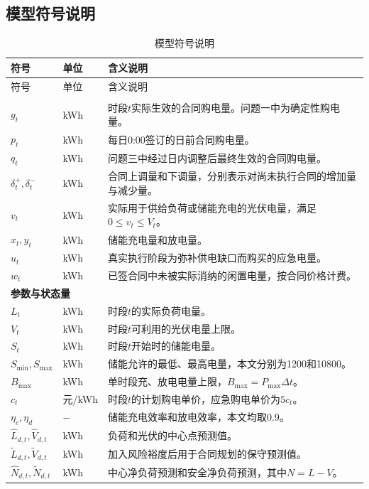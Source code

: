 \subsection{模型符号说明}
{\scriptsize
\begin{longtable}{p{}p{}p{}}
\caption{模型符号说明}\label{tab:symbol}\\
\toprule
符号 & 单位 & 含义说明 \\
\midrule
\endfirsthead
\toprule
符号 & 单位 & 含义说明 \\
\midrule
\endhead
\bottomrule
\endfoot
\multicolumn{3}{l}{\textbf{决策变量}}\\
$g_t$ & kWh & 时段$t$实际生效的合同购电量。问题一中为确定性购电量。 \\
$p_t$ & kWh & 每日0:00签订的日前合同购电量。 \\
$q_t$ & kWh & 问题三中经过日内调整后最终生效的合同购电量。 \\
$\delta_t^+,\delta_t^-$ & kWh & 合同上调量和下调量，分别表示对尚未执行合同的增加量与减少量。 \\
$v_t$ & kWh & 实际用于供给负荷或储能充电的光伏电量，满足$0\le v_t\le V_t$。 \\
$x_t,y_t$ & kWh & 储能充电量和放电量。 \\
$u_t$ & kWh & 真实执行阶段为弥补供电缺口而购买的应急电量。 \\
$w_t$ & kWh & 已签合同中未被实际消纳的闲置电量，按合同价格计费。 \\
\midrule
\multicolumn{3}{l}{\textbf{参数与状态量}}\\
$L_t$ & kWh & 时段$t$的实际负荷电量。 \\
$V_t$ & kWh & 时段$t$可利用的光伏电量上限。 \\
$S_t$ & kWh & 时段$t$开始时的储能电量。 \\
$S_{\min},S_{\max}$ & kWh & 储能允许的最低、最高电量，本文分别为1200和10800。 \\
$B_{\max}$ & kWh & 单时段充、放电电量上限，$B_{\max}=P_{\max}\Delta t$。 \\
$c_t$ & 元/kWh & 时段$t$的计划购电单价，应急购电单价为$5c_t$。 \\
$\eta_c,\eta_d$ & $-$ & 储能充电效率和放电效率，本文均取0.9。 \\
$\hat L_{d,t},\hat V_{d,t}$ & kWh & 负荷和光伏的中心点预测值。 \\
$\widetilde L_{d,t},\widetilde V_{d,t}$ & kWh & 加入风险裕度后用于合同规划的保守预测值。 \\
$\hat N_{d,t},\widetilde N_{d,t}$ & kWh & 中心净负荷预测和安全净负荷预测，其中$N=L-V$。 \\

\end{longtable}}

